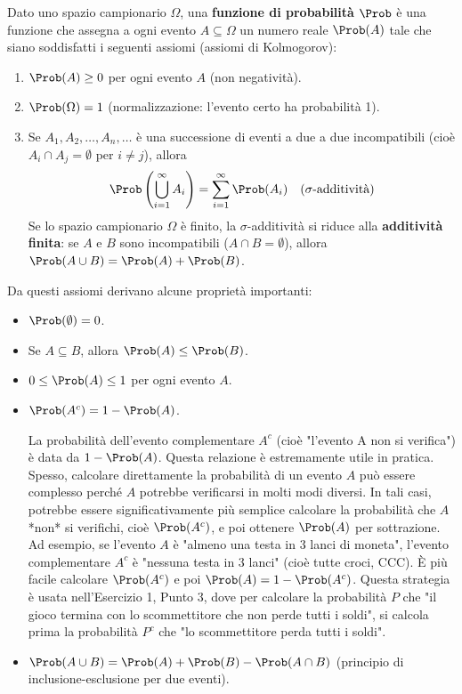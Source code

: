 \begin{definition}[Probabilità]
Dato uno spazio campionario $\Omega$, una \textbf{funzione di probabilità} $\Prob$ è una funzione che assegna a ogni evento $A \subseteq \Omega$ un numero reale $\Prob(A)$ tale che siano soddisfatti i seguenti assiomi (assiomi di Kolmogorov):
\begin{enumerate}
    \item $\Prob(A) \ge 0$ per ogni evento $A$ (non negatività).
    \item $\Prob(\Omega) = 1$ (normalizzazione: l'evento certo ha probabilità 1).
    \item Se $A_1, A_2, \dots, A_n, \dots$ è una successione di eventi a due a due incompatibili (cioè $A_i \cap A_j = \emptyset$ per $i \neq j$), allora
    \[ \Prob\left(\bigcup_{i=1}^{\infty} A_i\right) = \sum_{i=1}^{\infty} \Prob(A_i) \quad (\sigma\text{-additività}) \]
    Se lo spazio campionario $\Omega$ è finito, la $\sigma$-additività si riduce alla \textbf{additività finita}: se $A$ e $B$ sono incompatibili ($A \cap B = \emptyset$), allora $\Prob(A \cup B) = \Prob(A) + \Prob(B)$.
\end{enumerate}
\end{definition}

Da questi assiomi derivano alcune proprietà importanti:
\begin{itemize}
    \item $\Prob(\emptyset) = 0$.
    \item Se $A \subseteq B$, allora $\Prob(A) \le \Prob(B)$.
    \item $0 \le \Prob(A) \le 1$ per ogni evento $A$.
    \item $\Prob(A^c) = 1 - \Prob(A)$.
\begin{remark}\label{remark:complementare}
La probabilità dell'evento complementare $A^c$ (cioè "l'evento A non si verifica") è data da $1 - \Prob(A)$. Questa relazione è estremamente utile in pratica. Spesso, calcolare direttamente la probabilità di un evento $A$ può essere complesso perché $A$ potrebbe verificarsi in molti modi diversi. In tali casi, potrebbe essere significativamente più semplice calcolare la probabilità che $A$ *non* si verifichi, cioè $\Prob(A^c)$, e poi ottenere $\Prob(A)$ per sottrazione.
Ad esempio, se l'evento $A$ è "almeno una testa in 3 lanci di moneta", l'evento complementare $A^c$ è "nessuna testa in 3 lanci" (cioè tutte croci, CCC). È più facile calcolare $\Prob(A^c)$ e poi $\Prob(A) = 1 - \Prob(A^c)$.
Questa strategia è usata nell'Esercizio 1, Punto 3, dove per calcolare la probabilità $P$ che "il gioco termina con lo scommettitore che non perde tutti i soldi", si calcola prima la probabilità $P^c$ che "lo scommettitore perda tutti i soldi".
\end{remark}
    \item $\Prob(A \cup B) = \Prob(A) + \Prob(B) - \Prob(A \cap B)$ (principio di inclusione-esclusione per due eventi).
\end{itemize}

